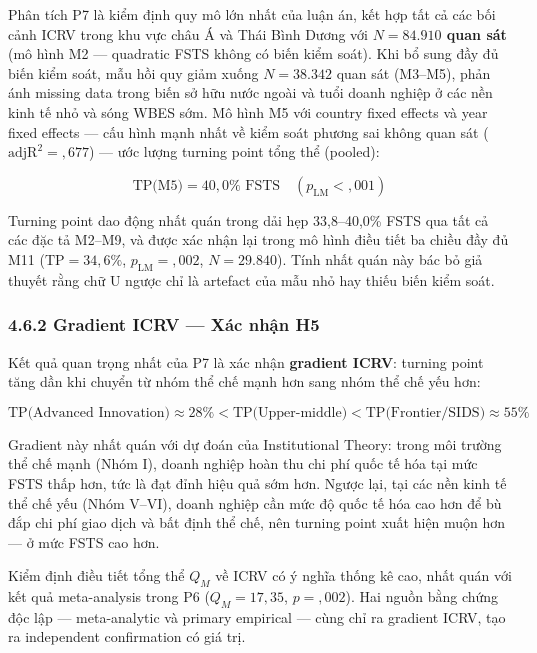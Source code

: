 \documentclass[12pt,a4paper]{article}
\begin{document}
Phân tích P7 là kiểm định quy mô lớn nhất của luận án, kết hợp tất cả
các bối cảnh ICRV trong khu vực châu Á và Thái Bình Dương với
\textbf{\(N = 84.910\) quan sát} (mô hình M2 --- quadratic FSTS không có
biến kiểm soát). Khi bổ sung đầy đủ biến kiểm soát, mẫu hồi quy giảm
xuống \(N = 38.342\) quan sát (M3--M5), phản ánh missing data trong biến
sở hữu nước ngoài và tuổi doanh nghiệp ở các nền kinh tế nhỏ và sóng
WBES sớm. Mô hình M5 với country fixed effects và year fixed effects ---
cấu hình mạnh nhất về kiểm soát phương sai không quan sát
(\(\text{adjR}^2 = {,}677\)) --- ước lượng turning point tổng thể
(pooled):

\[\text{TP(M5)} = 40{,}0\% \text{ FSTS} \quad (p_{\text{LM}} < {,}001)\]

Turning point dao động nhất quán trong dải hẹp 33,8--40,0\% FSTS qua tất
cả các đặc tả M2--M9, và được xác nhận lại trong mô hình điều tiết ba
chiều đầy đủ M11 (\(\text{TP} = 34{,}6\%\), \(p_{\text{LM}} = {,}002\),
\(N = 29.840\)). Tính nhất quán này bác bỏ giả thuyết rằng chữ U ngược
chỉ là artefact của mẫu nhỏ hay thiếu biến kiểm soát.

\hypertarget{462-gradient-icrv--xuxe1c-nhux1eadn-h5}{%
\subsubsection{4.6.2 Gradient ICRV --- Xác nhận
H5}\label{462-gradient-icrv--xuxe1c-nhux1eadn-h5}}

Kết quả quan trọng nhất của P7 là xác nhận \textbf{gradient ICRV}:
turning point tăng dần khi chuyển từ nhóm thể chế mạnh hơn sang nhóm thể
chế yếu hơn:

\[\text{TP(Advanced Innovation)} \approx 28\% < \text{TP(Upper-middle)} < \text{TP(Frontier/SIDS)} \approx 55\%\]

Gradient này nhất quán với dự đoán của Institutional Theory: trong môi
trường thể chế mạnh (Nhóm I), doanh nghiệp hoàn thu chi phí quốc tế hóa
tại mức FSTS thấp hơn, tức là đạt đỉnh hiệu quả sớm hơn. Ngược lại, tại
các nền kinh tế thể chế yếu (Nhóm V--VI), doanh nghiệp cần mức độ quốc
tế hóa cao hơn để bù đắp chi phí giao dịch và bất định thể chế, nên
turning point xuất hiện muộn hơn --- ở mức FSTS cao hơn.

Kiểm định điều tiết tổng thể \(Q_M\) về ICRV có ý nghĩa thống kê cao,
nhất quán với kết quả meta-analysis trong P6 (\(Q_M = 17{,}35\),
\(p = {,}002\)). Hai nguồn bằng chứng độc lập --- meta-analytic và
primary empirical --- cùng chỉ ra gradient ICRV, tạo ra independent
confirmation có giá trị.
\end{document}
